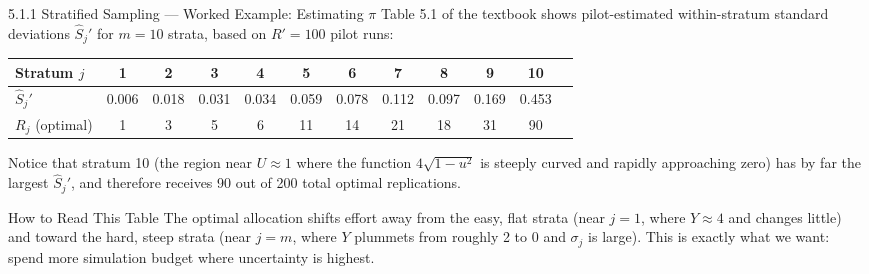 \documentclass[aspectratio=169,10pt]{beamer}
\begin{document}
\begin{frame}[allowframebreaks]{5.1.1 Stratified Sampling --- Worked Example: Estimating $\pi$}
\medskip
Table 5.1 of the textbook shows pilot-estimated within-stratum standard
deviations $\hat{S}_j'$ for $m=10$ strata, based on $R'=100$ pilot runs:

\begin{center}\small
  \begin{tabular}{lccccccccccc}
    \toprule
    Stratum $j$ & 1 & 2 & 3 & 4 & 5 & 6 & 7 & 8 & 9 & 10 \\
    \midrule
    $\hat{S}_j'$ & 0.006 & 0.018 & 0.031 & 0.034 & 0.059 & 0.078 & 0.112 & 0.097 & 0.169 & 0.453 \\
    $R_j$ (optimal) & 1 & 3 & 5 & 6 & 11 & 14 & 21 & 18 & 31 & 90 \\
    \bottomrule
  \end{tabular}
\end{center}

Notice that stratum 10 (the region near $U \approx 1$ where the function
$4\sqrt{1-u^2}$ is steeply curved and rapidly approaching zero) has by far
the largest $\hat{S}_j'$, and therefore receives 90 out of 200 total optimal
replications.

\begin{alertblock}{How to Read This Table}
  The optimal allocation shifts effort away from the easy, flat strata
  (near $j=1$, where $Y \approx 4$ and changes little) and toward the hard,
  steep strata (near $j=m$, where $Y$ plummets from roughly 2 to 0 and
  $\sigma_j$ is large).  This is exactly what we want: spend more simulation
  budget where uncertainty is highest.
\end{alertblock}

\end{frame}
\end{document}
